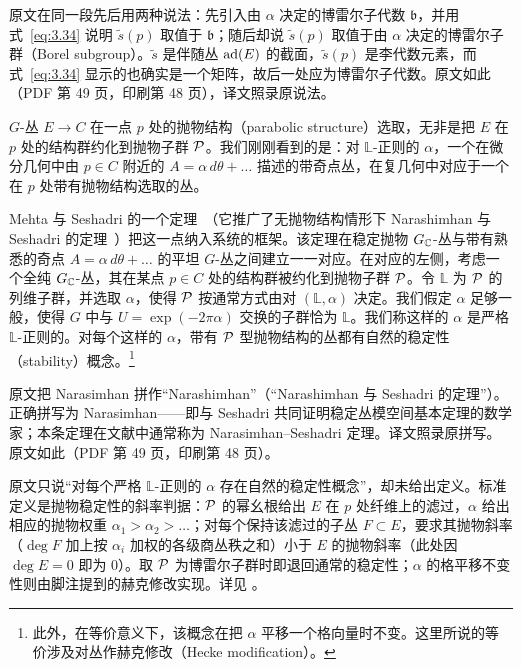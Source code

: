 \begin{yizhu}[原文疑误]原文在同一段先后用两种说法：先引入由 $\alpha$ 决定的博雷尔子代数 $\mathfrak b$，并用式~\eqref{eq:3.34} 说明 $\tilde s(p)$ 取值于 $\mathfrak b$；随后却说 $\tilde s(p)$ 取值于由 $\alpha$ 决定的博雷尔子群（Borel subgroup）。$\tilde s$ 是伴随丛 ${\rm ad}(E)$ 的截面，$\tilde s(p)$ 是李代数元素，而式~\eqref{eq:3.34} 显示的也确实是一个矩阵，故后一处应为博雷尔子代数。原文如此（PDF 第 49 页，印刷第 48 页），译文照录原说法。\end{yizhu}

$G$-丛 $E\to C$ 在一点 $p$ 处的抛物结构（parabolic structure）选取，无非是把 $E$ 在 $p$ 处的结构群约化到抛物子群 $\mathcal{P}$。我们刚刚看到的是：对 $\mathbb{L}$-正则的 $\alpha$，一个在微分几何中由 $p\in C$ 附近的 $A=\alpha\,d\theta+\dots$ 描述的带奇点丛，在复几何中对应于一个在 $p$ 处带有抛物结构选取的丛。

Mehta 与 Seshadri 的一个定理~\cite{ref50}（它推广了无抛物结构情形下 Narashimhan 与 Seshadri 的定理~\cite{ref51}）把这一点纳入系统的框架。该定理在稳定抛物 $G_{\mathbb{C}}$-丛与带有熟悉的奇点 $A=\alpha\,d\theta+\dots$ 的平坦 $G$-丛之间建立一一对应。在对应的左侧，考虑一个全纯 $G_{\mathbb{C}}$-丛，其在某点 $p\in C$ 处的结构群被约化到抛物子群 $\mathcal{P}$。令 $\mathbb{L}$ 为 $\mathcal{P}$ 的列维子群，并选取 $\alpha$，使得 $\mathcal{P}$ 按通常方式由对 $(\mathbb{L},\alpha)$ 决定。我们假定 $\alpha$ 足够一般，使得 $G$ 中与 $U=\exp(-2\pi\alpha)$ 交换的子群恰为 $\mathbb{L}$。我们称这样的 $\alpha$ 是严格 $\mathbb{L}$-正则的。对每个这样的 $\alpha$，带有 $\mathcal{P}$ 型抛物结构的丛都有自然的稳定性（stability）概念。\footnote{此外，在等价意义下，该概念在把 $\alpha$ 平移一个格向量时不变。这里所说的等价涉及对丛作赫克修改（Hecke modification）。}

\begin{yizhu}[原文疑误]原文把 Narasimhan 拼作“Narashimhan”（“Narashimhan 与 Seshadri 的定理”）。正确拼写为 Narasimhan——即与 Seshadri 共同证明稳定丛模空间基本定理的数学家；本条定理在文献中通常称为 Narasimhan–Seshadri 定理。译文照录原拼写。原文如此（PDF 第 49 页，印刷第 48 页）。\end{yizhu}

\begin{yizhu}[易错点]原文只说“对每个严格 $\mathbb{L}$-正则的 $\alpha$ 存在自然的稳定性概念”，却未给出定义。标准定义是抛物稳定性的斜率判据：$\mathcal{P}$ 的幂幺根给出 $E$ 在 $p$ 处纤维上的滤过，$\alpha$ 给出相应的抛物权重 $\alpha_1>\alpha_2>\dots$；对每个保持该滤过的子丛 $F\subset E$，要求其抛物斜率（$\deg F$ 加上按 $\alpha_i$ 加权的各级商丛秩之和）小于 $E$ 的抛物斜率（此处因 $\deg E=0$ 即为 $0$）。取 $\mathcal{P}$ 为博雷尔子群时即退回通常的稳定性；$\alpha$ 的格平移不变性则由脚注提到的赫克修改实现。详见 \cite{ref50}。\end{yizhu}

